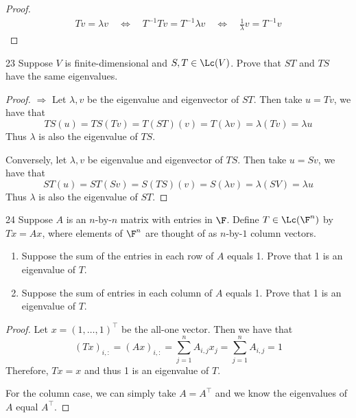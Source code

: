 \documentclass{extarticle}
\begin{document}
\begin{proof}
\begin{align*}
    Tv = \lambda v \quad \Longleftrightarrow \quad 
    T^{-1} T v = T^{-1} \lambda v \quad \Longleftrightarrow \quad
    \frac{1}{\lambda} v = T^{-1} v   
\end{align*}
\end{proof}

\begin{problem}{23}
    Suppose \(V\) is finite-dimensional and \(S, T \in \Lc(V)\). Prove that \(ST\) and \(TS\)
    have the same eigenvalues. 
\end{problem}

\begin{proof}
\(\Rightarrow\) Let \(\lambda, v\) be the eigenvalue and eigenvector of \(ST\). Then take 
\(u = Tv\), we have that 
\[TS(u) = TS(Tv) = T(ST)(v) = T (\lambda v) = \lambda (Tv) = \lambda u\]
Thus \(\lambda\) is also the eigenvalue of \(TS\). 

Conversely, let \(\lambda, v\) be eigenvalue and eigenvector of \(TS\). Then take 
\(u = Sv\), we have that 
\[ST(u) = ST(Sv) = S(TS) (v) = S(\lambda v) = \lambda (SV) = \lambda u\]
Thus \(\lambda\) is also the eigenvalue of \(ST\). 
\end{proof}

\begin{problem}{24}
    Suppose \(A\) is an \(n\)-by-\(n\) matrix with entries in \(\F\). Define 
    \(T \in \Lc(\F^n)\) by \(Tx = Ax\), where elements of \(\F^n\) are thought of 
    as \(n\)-by-\(1\) column vectors. 
    \begin{enumerate}[label=(\alph*)]
        \item Suppose the sum of the entries in each row of \(A\) equals 1. Prove that 
        1 is an eigenvalue of \(T\).
        \item Suppose the sum of entries in each column of \(A\) equals 1. Prove that 
        1 is an eigenvalue of \(T\).
    \end{enumerate}
\end{problem}

\begin{proof}
Let \(x = (1, \ldots, 1)^\top\) be the all-one vector. Then we have that 
\[(Tx)_{i, \colon} = (Ax)_{i, \colon} = \sum_{j=1}^{n} A_{i, j} x_j = \sum_{j=1}^{n} A_{i, j} = 1\]
Therefore, \(Tx = x\) and thus 1 is an eigenvalue of \(T\). 

For the column case, we can simply take \(A = A^\top\) and we know the eigenvalues of \(A\) equal 
\(A^\top\). 
\end{proof}
\end{document}
